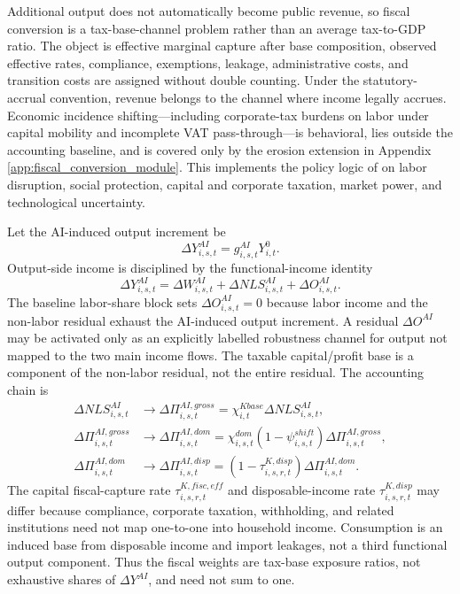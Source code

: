 \documentclass[11pt,a4paper]{article}
\begin{document}
Additional output does not automatically become public revenue, so fiscal conversion is a tax-base-channel problem rather than an average tax-to-GDP ratio. The object is effective marginal capture after base composition, observed effective rates, compliance, exemptions, leakage, administrative costs, and transition costs are assigned without double counting. Under the statutory-accrual convention, revenue belongs to the channel where income legally accrues. Economic incidence shifting---including corporate-tax burdens on labor under capital mobility and incomplete VAT pass-through---is behavioral, lies outside the accounting baseline, and is covered only by the erosion extension in Appendix \ref{app:fiscal_conversion_module}. This implements the policy logic of \citet{brollo2024fiscal} on labor disruption, social protection, capital and corporate taxation, market power, and technological uncertainty.

Let the AI-induced output increment be
\begin{equation}
    \Delta Y^{AI}_{i,s,t}=g^{AI}_{i,s,t}Y^0_{i,t}.
\end{equation}
Output-side income is disciplined by the functional-income identity
\begin{equation}
    \Delta Y^{AI}_{i,s,t}=\Delta W^{AI}_{i,s,t}+\Delta NLS^{AI}_{i,s,t}+\Delta O^{AI}_{i,s,t}.
\end{equation}
The baseline labor-share block sets $\Delta O^{AI}_{i,s,t}=0$ because labor income and the non-labor residual exhaust the AI-induced output increment. A residual $\Delta O^{AI}$ may be activated only as an explicitly labelled robustness channel for output not mapped to the two main income flows. The taxable capital/profit base is a component of the non-labor residual, not the entire residual. The accounting chain is
\begin{equation}\label{eq:capital_base_chain_v17}
\begin{split}
    \Delta NLS^{AI}_{i,s,t}
    &\rightarrow \Delta\Pi^{AI,gross}_{i,s,t}
    =\chi^{Kbase}_{i,t}\Delta NLS^{AI}_{i,s,t},\\
    \Delta\Pi^{AI,gross}_{i,s,t}
    &\rightarrow \Delta\Pi^{AI,dom}_{i,s,t}
    =\chi^{dom}_{i,s,t}(1-\psi^{shift}_{i,s,t})\Delta\Pi^{AI,gross}_{i,s,t},\\
    \Delta\Pi^{AI,dom}_{i,s,t}
    &\rightarrow \Delta\Pi^{AI,disp}_{i,s,t}
    =(1-\tau^{K,disp}_{i,s,r,t})\Delta\Pi^{AI,dom}_{i,s,t}.
\end{split}
\end{equation}
The capital fiscal-capture rate $\tau^{K,fisc,eff}_{i,s,r,t}$ and disposable-income rate $\tau^{K,disp}_{i,s,r,t}$ may differ because compliance, corporate taxation, withholding, and related institutions need not map one-to-one into household income. Consumption is an induced base from disposable income and import leakages, not a third functional output component. Thus the fiscal weights are tax-base exposure ratios, not exhaustive shares of $\Delta Y^{AI}$, and need not sum to one.
\end{document}
